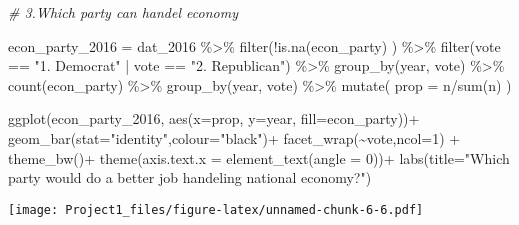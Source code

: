 \documentclass[
]{article}
\newenvironment{Shaded}{\begin{snugshade}}{\end{snugshade}}
\newcommand{\AttributeTok}[1]{\textcolor[rgb]{0.77,0.63,0.00}{#1}}
\newcommand{\CommentTok}[1]{\textcolor[rgb]{0.56,0.35,0.01}{\textit{#1}}}
\newcommand{\DecValTok}[1]{\textcolor[rgb]{0.00,0.00,0.81}{#1}}
\newcommand{\FunctionTok}[1]{\textcolor[rgb]{0.00,0.00,0.00}{#1}}
\newcommand{\NormalTok}[1]{#1}
\newcommand{\OtherTok}[1]{\textcolor[rgb]{0.56,0.35,0.01}{#1}}
\newcommand{\SpecialCharTok}[1]{\textcolor[rgb]{0.00,0.00,0.00}{#1}}
\newcommand{\StringTok}[1]{\textcolor[rgb]{0.31,0.60,0.02}{#1}}
\begin{document}
\begin{Shaded}
\begin{Highlighting}[]
\CommentTok{\# 3.Which party can handel economy}

\NormalTok{econ\_party\_2016 }\OtherTok{=}\NormalTok{ dat\_2016 }\SpecialCharTok{\%\textgreater{}\%}
  \FunctionTok{filter}\NormalTok{(}\SpecialCharTok{!}\FunctionTok{is.na}\NormalTok{(econ\_party) ) }\SpecialCharTok{\%\textgreater{}\%}
  \FunctionTok{filter}\NormalTok{(vote }\SpecialCharTok{==} \StringTok{"1. Democrat"} \SpecialCharTok{|}\NormalTok{ vote }\SpecialCharTok{==} \StringTok{"2. Republican"}\NormalTok{) }\SpecialCharTok{\%\textgreater{}\%}
  \FunctionTok{group\_by}\NormalTok{(year, vote) }\SpecialCharTok{\%\textgreater{}\%}
  \FunctionTok{count}\NormalTok{(econ\_party) }\SpecialCharTok{\%\textgreater{}\%}
  \FunctionTok{group\_by}\NormalTok{(year, vote) }\SpecialCharTok{\%\textgreater{}\%}
  \FunctionTok{mutate}\NormalTok{(}
    \AttributeTok{prop =}\NormalTok{ n}\SpecialCharTok{/}\FunctionTok{sum}\NormalTok{(n)}
\NormalTok{  )}

\FunctionTok{ggplot}\NormalTok{(econ\_party\_2016,}
       \FunctionTok{aes}\NormalTok{(}\AttributeTok{x=}\NormalTok{prop, }\AttributeTok{y=}\NormalTok{year, }\AttributeTok{fill=}\NormalTok{econ\_party))}\SpecialCharTok{+}
  \FunctionTok{geom\_bar}\NormalTok{(}\AttributeTok{stat=}\StringTok{"identity"}\NormalTok{,}\AttributeTok{colour=}\StringTok{"black"}\NormalTok{)}\SpecialCharTok{+}
  \FunctionTok{facet\_wrap}\NormalTok{(}\SpecialCharTok{\textasciitilde{}}\NormalTok{vote,}\AttributeTok{ncol=}\DecValTok{1}\NormalTok{) }\SpecialCharTok{+}
  \FunctionTok{theme\_bw}\NormalTok{()}\SpecialCharTok{+}
  \FunctionTok{theme}\NormalTok{(}\AttributeTok{axis.text.x =} \FunctionTok{element\_text}\NormalTok{(}\AttributeTok{angle =} \DecValTok{0}\NormalTok{))}\SpecialCharTok{+}
  \FunctionTok{labs}\NormalTok{(}\AttributeTok{title=}\StringTok{"Which party would do a better job handeling national economy?"}\NormalTok{)}
\end{Highlighting}
\end{Shaded}

\texttt{[image: Project1\_files/figure-latex/unnamed-chunk-6-6.pdf]}
\end{document}
